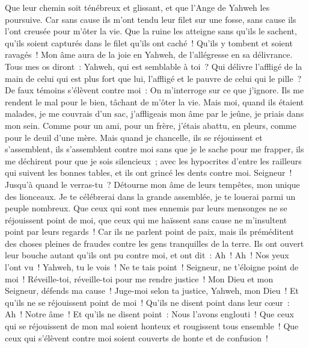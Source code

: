 \begin{multicols}{2}
Que leur chemin soit ténébreux et glissant, et que l'Ange de Yahweh les poursuive.
Car sans cause ils m'ont tendu leur filet sur une fosse, sans cause ils l'ont creusée pour m'ôter la vie.
Que la ruine les atteigne sans qu'ils le sachent, qu'ils soient capturés dans le filet qu'ils ont caché~! Qu'ils y tombent et soient ravagés~!
Mon âme aura de la joie en Yahweh, de l'allégresse en sa délivrance.
Tous mes os diront~: Yahweh, qui est semblable à toi~? Qui délivre l'affligé de la main de celui qui est plus fort que lui, l'affligé et le pauvre de celui qui le pille~?
De faux témoins s'élèvent contre moi~: On m'interroge sur ce que j'ignore.
Ils me rendent le mal pour le bien, tâchant de m'ôter la vie.
Mais moi, quand ils étaient malades, je me couvrais d'un sac, j'affligeais mon âme par le jeûne, je priais dans mon sein.
Comme pour un ami, pour un frère, j'étais abattu, en pleurs, comme pour le deuil d'une mère.
Mais quand je chancelle, ils se réjouissent et s'assemblent, ils s'assemblent contre moi sans que je le sache pour me frapper, ils me déchirent pour que je sois silencieux~;
avec les hypocrites d'entre les railleurs qui suivent les bonnes tables, et ils ont grincé les dents contre moi.
Seigneur~! Jusqu'à quand le verras-tu~? Détourne mon âme de leurs tempêtes, mon unique des lionceaux.
Je te célébrerai dans la grande assemblée, je te louerai parmi un peuple nombreux.
Que ceux qui sont mes ennemis par leurs mensonges ne se réjouissent point de moi, que ceux qui me haïssent sans cause ne m'insultent point par leurs regards~!
Car ils ne parlent point de paix, mais ils préméditent des choses pleines de fraudes contre les gens tranquilles de la terre.
Ils ont ouvert leur bouche autant qu'ils ont pu contre moi, et ont dit~: Ah~! Ah~! Nos yeux l'ont vu~!
Yahweh, tu le vois~! Ne te tais point~! Seigneur, ne t'éloigne point de moi~!
Réveille-toi, réveille-toi pour me rendre justice~! Mon Dieu et mon Seigneur, défends ma cause~!
Juge-moi selon ta justice, Yahweh, mon Dieu~! Et qu'ils ne se réjouissent point de moi~!
Qu'ils ne disent point dans leur cœur~: Ah~! Notre âme~! Et qu'ils ne disent point~: Nous l'avons englouti~!
Que ceux qui se réjouissent de mon mal soient honteux et rougissent tous ensemble~! Que ceux qui s'élèvent contre moi soient couverts de honte et de confusion~!

\end{multicols}
